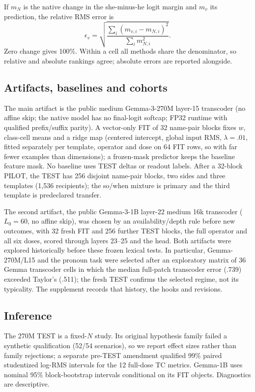 \documentclass[11pt]{article}
\begin{document}
If $m_N$ is the native change in the she-minus-he logit margin and $m_v$ its prediction, the relative RMS error is
\[
 \epsilon_v=\sqrt{\frac{\sum_i(m_{v,i}-m_{N,i})^2}{\sum_i m_{N,i}^2}}.
\]
Zero change gives 100\%. Within a cell all methods share the denominator, so relative and absolute rankings agree; absolute errors are reported alongside.

\subsection{Artifacts, baselines and cohorts}
The main artifact is the public medium Gemma-3-270M layer-15 transcoder (no affine skip; the native model has no final-logit softcap; FP32 runtime with qualified prefix/suffix parity). A vector-only FIT of 32 name-pair blocks fixes $w$, class-cell means and a ridge map (centered intercept, global input RMS, $\lambda=.01$, fitted separately per template, operator and dose on 64 FIT rows, so with far fewer examples than dimensions); a frozen-mask predictor keeps the baseline feature mask. No baseline uses TEST deltas or readout labels. After a 32-block PILOT, the TEST has 256 disjoint name-pair blocks, two sides and three templates (1,536 recipients); the so/when mixture is primary and the third template is predeclared transfer.

The second artifact, the public Gemma-3-1B layer-22 medium 16k transcoder ($L_0=60$, no affine skip), was chosen by an availability/depth rule before new outcomes, with 32 fresh FIT and 256 further TEST blocks, the full operator and all six doses, scored through layers 23--25 and the head. Both artifacts were explored historically before these frozen lexical tests. In particular, Gemma-270M/L15 and the pronoun task were selected after an exploratory matrix of 36 Gemma transcoder cells in which the median full-patch transcoder error (.739) exceeded Taylor's (.511); the fresh TEST confirms the selected regime, not its typicality. The supplement records that history, the hooks and revisions.

\subsection{Inference}
The 270M TEST is a fixed-$N$ study. Its original hypothesis family failed a synthetic qualification (52/54 scenarios), so we report effect sizes rather than family rejections; a separate pre-TEST amendment qualified 99\% paired studentized log-RMS intervals for the 12 full-dose TC metrics. Gemma-1B uses nominal 95\% block-bootstrap intervals conditional on its FIT objects. Diagnostics are descriptive.
\end{document}
